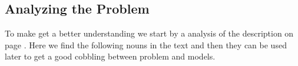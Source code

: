 \subsection{Analyzing the Problem}
To make get a better understanding we start by a analysis of the description on page \pageref{sc:problemdescription}. Here we find the following nouns in the text and then they can be used later to get a good cobbling between problem and models.